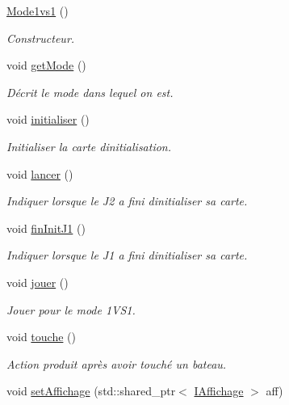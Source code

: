 \begin{DoxyCompactItemize}
\item 
\hyperlink{class_mode1vs1_aea3b243976c6b47ecaf1b2fd6181cd83}{Mode1vs1} ()
\begin{DoxyCompactList}\small\item\em Constructeur. \end{DoxyCompactList}\item 
void \hyperlink{class_mode1vs1_a7e38b115b83c63fe95a0fd96594c6fd9}{get\+Mode} ()
\begin{DoxyCompactList}\small\item\em Décrit le mode dans lequel on est. \end{DoxyCompactList}\item 
void \hyperlink{class_mode1vs1_a96b5ffac518dc015717e361248715e78}{initialiser} ()
\begin{DoxyCompactList}\small\item\em Initialiser la carte d\textquotesingle{}initialisation. \end{DoxyCompactList}\item 
void \hyperlink{class_mode1vs1_a4b62821aec55d3a01257eb9cf3d4fd28}{lancer} ()
\begin{DoxyCompactList}\small\item\em Indiquer lorsque le J2 a fini d\textquotesingle{}initialiser sa carte. \end{DoxyCompactList}\item 
void \hyperlink{class_mode1vs1_a21a9f0c6705700943538ce86ec252ad6}{fin\+Init\+J1} ()
\begin{DoxyCompactList}\small\item\em Indiquer lorsque le J1 a fini d\textquotesingle{}initialiser sa carte. \end{DoxyCompactList}\item 
void \hyperlink{class_mode1vs1_ac79db87b0b4a3c72ebf6300ed708c40d}{jouer} ()
\begin{DoxyCompactList}\small\item\em Jouer pour le mode 1\+V\+S1. \end{DoxyCompactList}\item 
void \hyperlink{class_mode1vs1_ac94642f3b6ca6b835ded37ed3e2fbf79}{touche} ()
\begin{DoxyCompactList}\small\item\em Action produit après avoir touché un bateau. \end{DoxyCompactList}\item 
void \hyperlink{class_mode1vs1_a24bb0744c4614af97c4e983b943a0360}{set\+Affichage} (std\+::shared\+\_\+ptr$<$ \hyperlink{class_i_affichage}{I\+Affichage} $>$ aff)

\end{DoxyCompactItemize}
